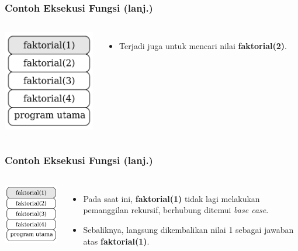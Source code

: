 \begin{frame}
\frametitle{Contoh Eksekusi Fungsi (lanj.)}
\begin{columns}
    \centering
    \includegraphics[width=4cm]{asset/rekursi-5.pdf}
    \begin{itemize}
      \item Terjadi juga untuk mencari nilai \textbf{faktorial(2)}.
    \end{itemize}
  \end{columns} 
\end{frame}

\begin{frame}
\frametitle{Contoh Eksekusi Fungsi (lanj.)}
\begin{columns}
    \centering
    \includegraphics[width=4cm]{asset/rekursi-5.pdf}
    \begin{itemize}
      \item Pada saat ini, \textbf{faktorial(1)} tidak lagi melakukan pemanggilan rekursif, berhubung ditemui \textit{base case}.
      \item Sebaliknya, langsung dikembalikan nilai 1 sebagai jawaban atas \textbf{faktorial(1)}.
    \end{itemize}
  \end{columns} 
\end{frame}


